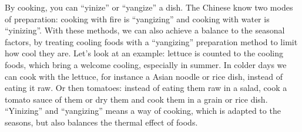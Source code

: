 \documentclass[../main.tex]{subfiles}
\begin{document}
\noindent By cooking, you can ``yinize'' or ``yangize'' a dish.
The Chinese know two modes of preparation: cooking with fire is ``yangizing'' and cooking with water is ``yinizing''.
With these methods, we can also achieve a balance to the seasonal factors, by treating cooling foods with a ``yangizing'' preparation method
to limit how cool they are.
Let's look at an example: lettuce is counted to the cooling foods, which bring a welcome cooling, especially in summer.
In colder days we can cook with the lettuce, for instance a Asian noodle or rice dish, instead of eating it raw.
Or then tomatoes: instead of eating them raw in a salad, cook a tomato sauce of them or dry them and cook them in a grain or rice dish.
``Yinizing'' and ``yangizing'' means a way of cooking, which is adapted to the seasons, but also balances the thermal effect of foods.
\end{document}
